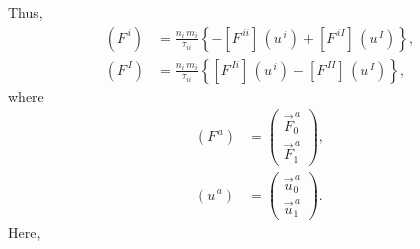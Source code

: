 \documentclass[12pt]{article}
\begin{document}
Thus, 
\begin{align}
(F^{\,i})&= \frac{n_i\,m_i}{\tau_{ii}}\left\{-\left[F^{\,ii}\right]\,(u^{\,i})+\left[F^{\,iI}\right]\,(u^{\,I})\right\},\\[0.5ex]
(F^{\,I})&= \frac{n_i\,m_i}{\tau_{ii}}\left\{\left[F^{\,Ii}\right]\,(u^{\,i})-\left[F^{\,II}\right]\,(u^{\,I})\right\},
\end{align}
where
\begin{align}
(F^{\,a})&= \left(\begin{array}{c}\vec{F}^{\,a}_0\\[0.5ex]\vec{F}^{\,a}_{1}\end{array}\right),\\[0.5ex]
(u^{\,a})&= \left(\begin{array}{c}\vec{u}^{\,a}_0\\[0.5ex]\vec{u}^{\,a}_1\end{array}\right).
\end{align}
Here,
\end{document}
